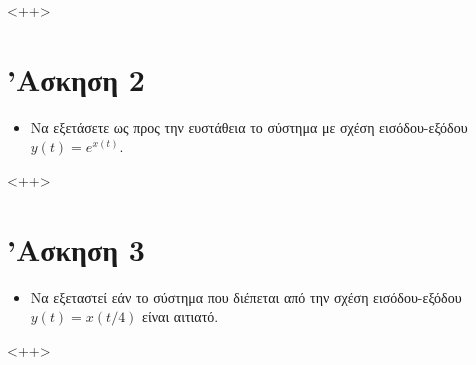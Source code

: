 \documentclass{article}
\begin{document}
<++>

\section{'Ασκηση 2}

\begin{itemize}
	\item Να εξετάσετε ως προς την ευστάθεια το σύστημα με σχέση
		εισόδου-εξόδου $y(t) = e^{x(t)}$.
\end{itemize}

<++>

\section{'Ασκηση 3}

\begin{itemize}
	\item Να εξεταστεί εάν το σύστημα που διέπεται από την σχέση
		εισόδου-εξόδου $y(t) = x(t/4)$ είναι αιτιατό.
\end{itemize}

<++>
\end{document}
